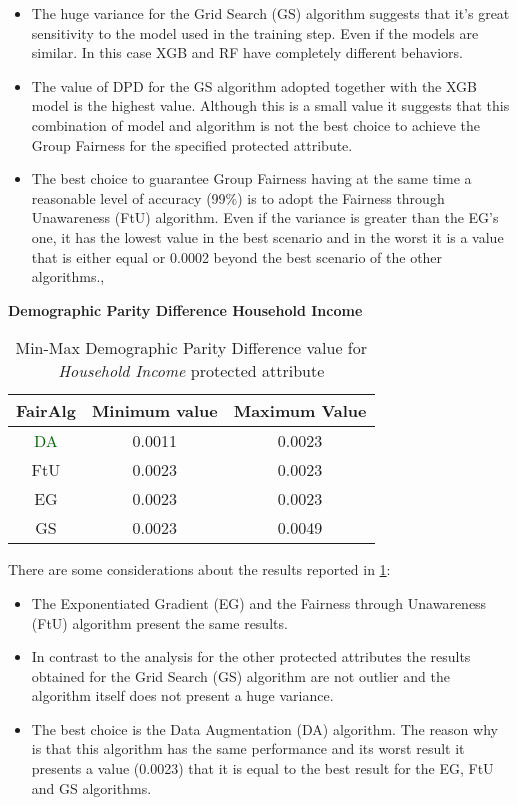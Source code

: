 \begin{itemize}
    \item The huge variance for the Grid Search (GS) algorithm suggests that it's great sensitivity to the model used in the training step. Even if the models are similar. In this case XGB and RF have completely different behaviors.

    \item The value of DPD for the GS algorithm adopted together with the XGB model is the highest value. Although this is a small value it suggests that this combination of model and algorithm is not the best choice to achieve the Group Fairness for the specified protected attribute.

    \item The best choice to guarantee Group Fairness having at the same time a reasonable level of accuracy (99\%) is to adopt the Fairness through Unawareness (FtU) algorithm. Even if the variance is greater than the EG's one, it has the lowest value in the best scenario and in the worst it is a value that is either equal or 0.0002 beyond the best scenario of the other algorithms., 
\end{itemize}

\textbf{Demographic Parity Difference Household Income}
\begin{table}
    \centering
    \begin{tabular}{|c|c|c|}
        \hline
        \textbf{FairAlg} & \textbf{Minimum value} & \textbf{Maximum Value} \\
        \hline
        \textcolor{darkgreen}{DA} & 0.0011 & 0.0023 \\
        \hline
        FtU & 0.0023 & 0.0023 \\
        \hline
        EG & 0.0023 & 0.0023 \\
        \hline
        GS & 0.0023 & 0.0049 \\
        \hline
    \end{tabular}
    \caption{Min-Max Demographic Parity Difference value for \emph{Household Income} protected attribute}
    \label{tab:h_dpd}
\end{table}

There are some considerations about the results reported in \cref{tab:h_dpd}:

\begin{itemize}
    \item The Exponentiated Gradient (EG) and the Fairness through Unawareness (FtU) algorithm present the same results.

    \item In contrast to the analysis for the other protected attributes the results obtained for the Grid Search (GS) algorithm are not outlier and the algorithm itself does not present a huge variance.

    \item The best choice is the Data Augmentation (DA) algorithm. The reason why is that this algorithm has the same performance and its worst result it presents a value (0.0023) that it is equal to the best result for the EG, FtU and GS algorithms.
\end{itemize}

